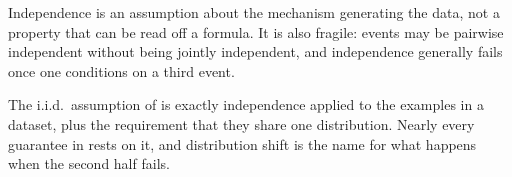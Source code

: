 Independence is an assumption about the mechanism generating the data, not a
property that can be read off a formula. It is also fragile: events may be
pairwise independent without being jointly independent, and independence
generally fails once one conditions on a third event.

\begin{remark}
The i.i.d.\ assumption of  is exactly independence
applied to the examples in a dataset, plus the requirement that they share one
distribution. Nearly every guarantee in  rests on it, and
distribution shift is the name for what happens when the second half fails.
\end{remark}
